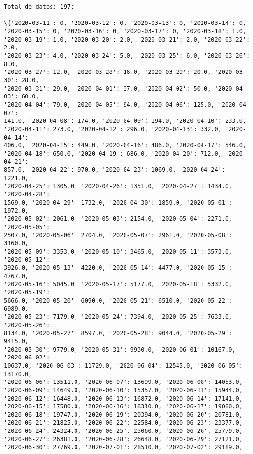 \documentclass[11pt]{article}
\begin{document}
    \begin{Verbatim}[commandchars=\\\{\}]
Total de datos: 197:

\{'2020-03-11': 0, '2020-03-12': 0, '2020-03-13': 0, '2020-03-14': 0,
'2020-03-15': 0, '2020-03-16': 0, '2020-03-17': 0, '2020-03-18': 1.0,
'2020-03-19': 1.0, '2020-03-20': 2.0, '2020-03-21': 2.0, '2020-03-22': 2.0,
'2020-03-23': 4.0, '2020-03-24': 5.0, '2020-03-25': 6.0, '2020-03-26': 8.0,
'2020-03-27': 12.0, '2020-03-28': 16.0, '2020-03-29': 20.0, '2020-03-30': 28.0,
'2020-03-31': 29.0, '2020-04-01': 37.0, '2020-04-02': 50.0, '2020-04-03': 60.0,
'2020-04-04': 79.0, '2020-04-05': 94.0, '2020-04-06': 125.0, '2020-04-07':
141.0, '2020-04-08': 174.0, '2020-04-09': 194.0, '2020-04-10': 233.0,
'2020-04-11': 273.0, '2020-04-12': 296.0, '2020-04-13': 332.0, '2020-04-14':
406.0, '2020-04-15': 449.0, '2020-04-16': 486.0, '2020-04-17': 546.0,
'2020-04-18': 650.0, '2020-04-19': 686.0, '2020-04-20': 712.0, '2020-04-21':
857.0, '2020-04-22': 970.0, '2020-04-23': 1069.0, '2020-04-24': 1221.0,
'2020-04-25': 1305.0, '2020-04-26': 1351.0, '2020-04-27': 1434.0, '2020-04-28':
1569.0, '2020-04-29': 1732.0, '2020-04-30': 1859.0, '2020-05-01': 1972.0,
'2020-05-02': 2061.0, '2020-05-03': 2154.0, '2020-05-04': 2271.0, '2020-05-05':
2507.0, '2020-05-06': 2704.0, '2020-05-07': 2961.0, '2020-05-08': 3160.0,
'2020-05-09': 3353.0, '2020-05-10': 3465.0, '2020-05-11': 3573.0, '2020-05-12':
3926.0, '2020-05-13': 4220.0, '2020-05-14': 4477.0, '2020-05-15': 4767.0,
'2020-05-16': 5045.0, '2020-05-17': 5177.0, '2020-05-18': 5332.0, '2020-05-19':
5666.0, '2020-05-20': 6090.0, '2020-05-21': 6510.0, '2020-05-22': 6989.0,
'2020-05-23': 7179.0, '2020-05-24': 7394.0, '2020-05-25': 7633.0, '2020-05-26':
8134.0, '2020-05-27': 8597.0, '2020-05-28': 9044.0, '2020-05-29': 9415.0,
'2020-05-30': 9779.0, '2020-05-31': 9930.0, '2020-06-01': 10167.0, '2020-06-02':
10637.0, '2020-06-03': 11729.0, '2020-06-04': 12545.0, '2020-06-05': 13170.0,
'2020-06-06': 13511.0, '2020-06-07': 13699.0, '2020-06-08': 14053.0,
'2020-06-09': 14649.0, '2020-06-10': 15357.0, '2020-06-11': 15944.0,
'2020-06-12': 16448.0, '2020-06-13': 16872.0, '2020-06-14': 17141.0,
'2020-06-15': 17580.0, '2020-06-16': 18310.0, '2020-06-17': 19080.0,
'2020-06-18': 19747.0, '2020-06-19': 20394.0, '2020-06-20': 20781.0,
'2020-06-21': 21825.0, '2020-06-22': 22584.0, '2020-06-23': 23377.0,
'2020-06-24': 24324.0, '2020-06-25': 25060.0, '2020-06-26': 25779.0,
'2020-06-27': 26381.0, '2020-06-28': 26648.0, '2020-06-29': 27121.0,
'2020-06-30': 27769.0, '2020-07-01': 28510.0, '2020-07-02': 29189.0,

\end{Verbatim}
\end{document}
